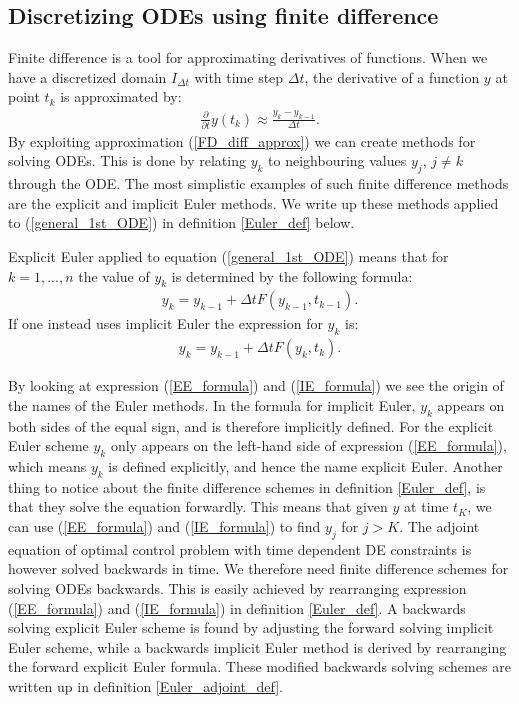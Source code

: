\subsection{Discretizing ODEs using finite difference} \label{FD_sub_sec}
Finite difference is a tool for approximating derivatives of functions. When we have a discretized domain $I_{\Delta t}$ with time step $\Delta t$, the derivative of a function $y$ at point $t_k$ is approximated by:
\begin{align}
\frac{\partial}{\partial t} y(t_k) \approx \frac{y_k-y_{k-1}}{\Delta t}. \label{FD_diff_approx}
\end{align}
By exploiting approximation (\ref{FD_diff_approx}) we can create methods for solving ODEs. This is done by relating $y_k$ to neighbouring values $y_j$, $j\neq k$ through the ODE. The most simplistic examples of such finite difference methods are the explicit and implicit Euler methods. We write up these methods applied to (\ref{general_1st_ODE}) in definition \ref{Euler_def} below.
\begin{definition} \label{Euler_def}
Explicit Euler applied to equation (\ref{general_1st_ODE}) means that for $k=1,...,n$ the value of $y_k$ is determined by the following formula:
\begin{align}
y_k = y_{k-1} +\Delta tF(y_{k-1},t_{k-1}).\label{EE_formula}
\end{align} 
If one instead uses implicit Euler the expression for $y_k$ is:
\begin{align}
y_k = y_{k-1} +\Delta tF(y_{k},t_{k}). \label{IE_formula}
\end{align}
\end{definition}
\noindent
By looking at expression (\ref{EE_formula}) and (\ref{IE_formula}) we see the origin of the names of the Euler methods. In the formula for implicit Euler, $y_k$ appears on both sides of the equal sign, and is therefore implicitly defined. For the explicit Euler scheme $y_k$ only appears on the left-hand side of expression (\ref{EE_formula}), which means $y_k$ is defined explicitly, and hence the name explicit Euler. Another thing to notice about the finite difference schemes in definition \ref{Euler_def}, is that they solve the equation forwardly. This means that given $y$ at time $t_K$, we can use (\ref{EE_formula}) and (\ref{IE_formula}) to find $y_j$ for $j>K$. The adjoint equation of optimal control problem with time dependent DE constraints is however solved backwards in time. We therefore need finite difference schemes for solving ODEs backwards. This is easily achieved by rearranging expression (\ref{EE_formula}) and (\ref{IE_formula}) in definition \ref{Euler_def}. A backwards solving explicit Euler scheme is found by adjusting the forward solving implicit Euler scheme, while a backwards implicit Euler method is derived by rearranging the forward explicit Euler formula. These modified backwards solving schemes are written up in definition \ref{Euler_adjoint_def}. 
